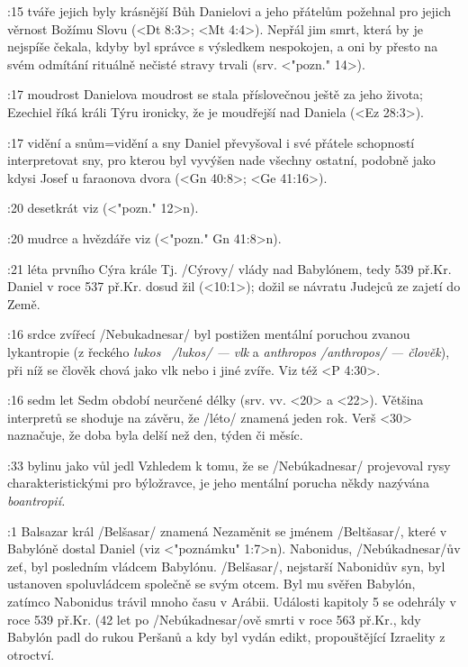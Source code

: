 :15 {tváře jejich byly krásnější} Bůh Danielovi a jeho přátelům požehnal pro jejich věrnost Božímu Slovu (<Dt 8:3>; <Mt 4:4>). Nepřál jim smrt, která by je nejspíše čekala, kdyby byl správce s výsledkem nespokojen, a oni by přesto na svém odmítání rituálně nečisté stravy trvali (srv. <"pozn." 14>). 

:17 {moudrost} Danielova moudrost se stala příslovečnou ještě za jeho života; Ezechiel říká králi Týru ironicky, že je moudřejší nad Daniela (<Ez 28:3>). 

:17 {vidění a snům}={vidění a sny} Daniel převyšoval i své přátele schopností interpretovat sny, pro kterou byl vyvýšen nade všechny ostatní, podobně jako kdysi Josef u faraonova dvora (<Gn 40:8>; <Ge 41:16>). 

:20 {desetkrát} viz (<"pozn." 12>n).

:20 {mudrce a hvězdáře} viz (<"pozn." Gn 41:8>n).

:21 {léta prvního Cýra krále} Tj. \x/Cýrovy/ vlády nad Babylónem, tedy 539 př.Kr. Daniel v roce 537 př.Kr. dosud žil (<10:1>); dožil se návratu Judejců ze zajetí do Země.

:16 {srdce zvířecí} %
     \x/Nebukadnesar/  byl postižen mentální poruchou zvanou lykantropie 
     (z řeckého {\em lukos \ {\x/lukos/} --- vlk} a {\em anthropos {\x/anthropos/} --- člověk}), 
     při níž  se člověk chová jako vlk nebo i jiné zvíře. Viz též <P 4:30>. 
     \dopsat

:16 {sedm let} 
     Sedm období neurčené délky (srv. vv. <20> a <22>). Většina interpretů se shoduje na závěru, že 
     \x/léto/ znamená jeden rok. Verš <30> naznačuje, že doba byla delší než den, týden či měsíc.

:33 {bylinu jako vůl jedl}
     Vzhledem k tomu, že  se \x/Nebúkadnesar/ projevoval rysy charakteristickými pro býložravce,
     je jeho mentální porucha někdy nazývána {\it boantropií.\/}

:1 {Balsazar král}
     \x/Belšasar/ znamená  
     Nezaměnit se jménem \x/Beltšasar/, které v Babylóně dostal Daniel (viz <"poznámku" 1:7>n). 
     Nabonidus, \x/Nebúkadnesar/ův zeť, byl posledním vládcem Babylónu. 
     \x/Belšasar/, nejstarší Nabonidův syn, byl ustanoven spoluvládcem společně se svým otcem.
     Byl mu svěřen Babylón, zatímco Nabonidus trávil mnoho času v Arábii.
     Události kapitoly 5 se odehrály v roce 539 př.Kr. (42 let po \x/Nebúkadnesar/ově
     smrti v roce 563 př.Kr., kdy Babylón padl do rukou Peršanů a kdy byl vydán
     edikt, propouštějící Izraelity z otroctví. 

